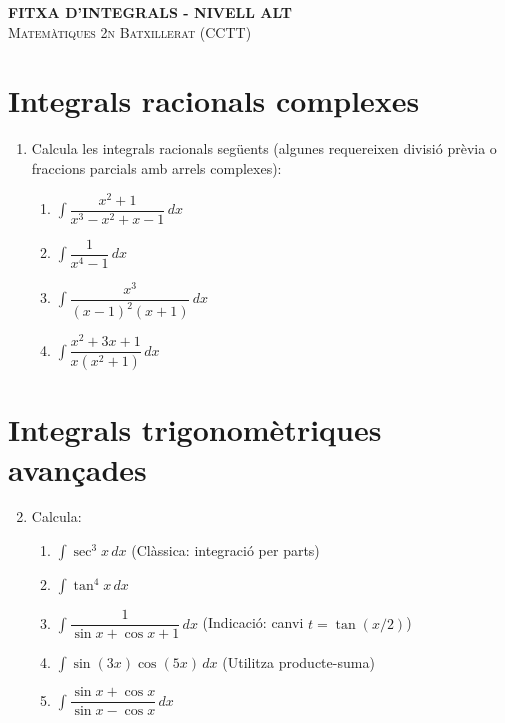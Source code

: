 \documentclass[12pt]{article}
\begin{document}
\begin{center}
    {\Large \textbf{FITXA D'INTEGRALS - NIVELL ALT}} \\
    \vspace{0.2cm}
    \textsc{Matemàtiques 2n Batxillerat (CCTT)}
\end{center}

\vspace{0.5cm}

\section*{Integrals racionals complexes}

\begin{enumerate}[label=\arabic*.]
    \item Calcula les integrals racionals següents (algunes requereixen divisió prèvia o fraccions parcials amb arrels complexes):
    \begin{enumerate}[label=\alph*)]
        \item $\displaystyle \int \dfrac{x^2+1}{x^3-x^2+x-1}\,dx$
        \item $\displaystyle \int \dfrac{1}{x^4-1}\,dx$
        \item $\displaystyle \int \dfrac{x^3}{(x-1)^2(x+1)}\,dx$
        \item $\displaystyle \int \dfrac{x^2+3x+1}{x(x^2+1)}\,dx$
    \end{enumerate}
\end{enumerate}

\section*{Integrals trigonomètriques avançades}

\begin{enumerate}[label=\arabic*.]
    \setcounter{enumi}{1}
    \item Calcula:
    \begin{enumerate}[label=\alph*)]
        \item $\displaystyle \int \sec^3 x\,dx$ \quad (Clàssica: integració per parts)
        \item $\displaystyle \int \tan^4 x\,dx$
        \item $\displaystyle \int \dfrac{1}{\sin x + \cos x + 1}\,dx$ \quad (Indicació: canvi $t=\tan(x/2)$)
        \item $\displaystyle \int \sin(3x)\cos(5x)\,dx$ \quad (Utilitza producte-suma)
        \item $\displaystyle \int \dfrac{\sin x + \cos x}{\sin x - \cos x}\,dx$
    \end{enumerate}
\end{enumerate}
\end{document}

